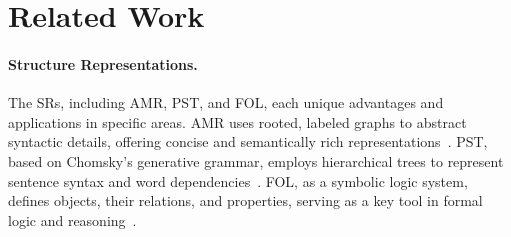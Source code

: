 \section{Related Work}
\label{gen_inst}

\paragraph{Structure Representations.}
The SRs, including AMR, PST, and FOL, each unique advantages and applications in specific areas. AMR uses rooted, labeled graphs to abstract syntactic details, offering concise and semantically rich representations~\citep{banarescu2013abstract}. PST, based on Chomsky's generative grammar, employs hierarchical trees to represent sentence syntax and word dependencies~\citep{chomsky2014aspects}. FOL, as a symbolic logic system, defines objects, their relations, and properties, serving as a key tool in formal logic and reasoning~\citep{enderton2001mathematical, barwise1977introduction}.

